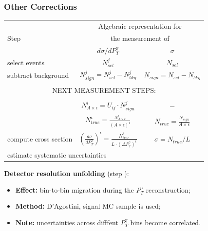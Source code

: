 \begin{frame}
\begin{figure}[htb]
\begin{center}
    \end{center}
  \end{figure}
\end{frame}%

\begin{frame}\frametitle{Other Corrections}

\begin{table}[h]
  \tiny
  \begin{center}
  \begin{tabular}{|l|c|c|}
    \hline
          & \multicolumn{2}{|c|}{Algebraic representation for} \\ 
     Step & \multicolumn{2}{|c|}{the measurement of} \\ 
          & $d\sigma/dP_{T}^{\gamma}$ & $\sigma$ \\ \hline
    select events & {\bfseries{$N_{sel}^j$}} &    {\bfseries{$N_{sel}$}}       \\ \hline
    subtract background & {\bfseries{$N_{sign}^j = N_{sel}^j - N_{bkg}^j$}} &    {\bfseries{$N_{sign}=N_{sel}-N_{bkg}$}}       \\ \hline
    \multicolumn{3}{|c|}{ } \\  
    \multicolumn{3}{|c|}{NEXT MEASUREMENT STEPS:} \\  
    \multicolumn{3}{|c|}{ } \\ \hline 
    {\bfseries\color{blue}{unfold}}   & {\color{blue}$N_{A\times\epsilon}^i = U_{ij} \cdot N_{sign}^j$} &    $-$       \\ \hline
    {\bfseries\color{blue}{correct for eff X acc}} & {\color{blue}$N_{true}^i = \frac{N_{A\times\epsilon}^i}{(A \times\epsilon)^i}$} &  {\color{blue}$N_{true}=\frac{N_{sign}}{A\times\epsilon}$}       \\ \hline
    compute cross section & $ \left( \frac{d\sigma}{dP_{T}^\gamma} \right) ^i = \frac{N_{true}^i}{L \cdot (\Delta P_T^\gamma)^i}$  &  $\sigma = N_{true}/L$       \\ \hline
    \multicolumn{3}{|l|}{estimate systematic uncertainties }         \\ \hline
  \end{tabular}
  \label{tab:analysisOutline}
  \end{center}
\end{table}

\scriptsize
{\bfseries{Detector resolution unfolding}} (step {\bfseries\color{blue}{``unfold''}}): 
  \begin{itemize} 
    \tiny
    \item {\bfseries{Effect:}} bin-to-bin migration during the $P_T^{\gamma}$ reconstruction; 
    \item {\bfseries{Method:}} D'Agostini, signal MC sample is used;
    \item {\bfseries{Note:}} uncertainties across difffent $P_T^{\gamma}$ bins become correlated.
  \end{itemize}


\end{frame}
